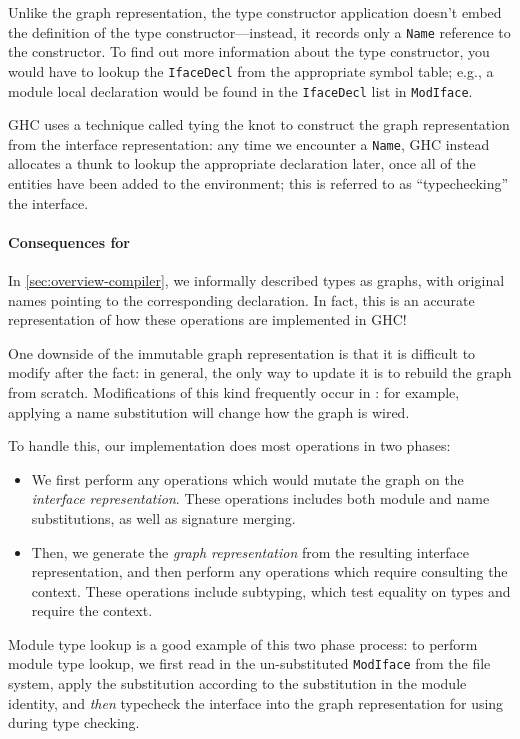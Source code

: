 \noindent
Unlike the graph representation, the type constructor application
doesn't embed the definition of the type constructor---instead,
it records only a \verb|Name| reference to the constructor. To find out
more information about the type constructor, you would have to lookup
the \verb|IfaceDecl| from the appropriate symbol table; e.g., a module
local declaration would be found in the \verb|IfaceDecl| list in
\verb|ModIface|.

GHC uses a technique called tying the knot
to construct the graph representation from the interface
representation: any time we encounter a \verb|Name|, GHC instead
allocates a thunk to lookup the appropriate declaration later,
once all of the entities have been added to the environment;
this is referred to as ``typechecking'' the interface.

\paragraph{Consequences for \Backpack{}}
In \cref{sec:overview-compiler}, we informally described
types as graphs, with original names pointing to the corresponding
declaration.  In fact, this is an accurate representation of how
these operations are implemented in GHC\@!

One downside of the immutable graph representation is that it is
difficult to modify after the fact: in general, the only way to update
it is to rebuild the graph from scratch.  Modifications of this kind
frequently occur in \Backpack{}: for example, applying a name
substitution will change how the graph is wired.

To handle this, our implementation does most operations in two
phases:

\begin{itemize}
    \item We first perform any operations which would
    mutate the graph on the \emph{interface representation}.
    These operations includes both module and name substitutions, as well
    as signature merging.
    \item Then, we generate the \emph{graph representation} from
    the resulting interface representation, and then perform any
    operations which require consulting the context.  These
    operations include subtyping, which test equality on types
    and require the context.
\end{itemize}
%
Module type lookup is a good example of this two phase process: to
perform module type lookup, we first read in the un-substituted
\verb|ModIface| from the file system, apply the substitution according
to the substitution in the module identity, and \emph{then} typecheck
the interface into the graph representation for using during type
checking.

